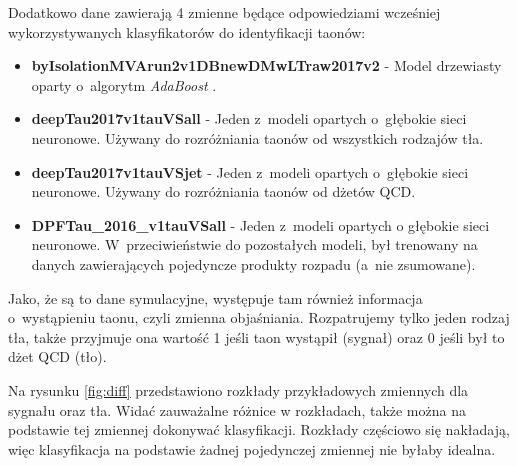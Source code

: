 \documentclass{pracalicmgr}
\begin{document}
	Dodatkowo dane zawierają 4 zmienne będące odpowiedziami wcześniej wykorzystywanych klasyfikatorów do identyfikacji taonów:
	\begin{itemize}
	\item \textbf{byIsolationMVArun2v1DBnewDMwLTraw2017v2} - Model drzewiasty oparty o~algorytm \textit{AdaBoost} \cite{freund1997decision}.
	\item \textbf{deepTau2017v1tauVSall} - Jeden z~modeli opartych o~głębokie sieci neuronowe. Używany do rozróżniania taonów od wszystkich rodzajów tła.
	\item \textbf{deepTau2017v1tauVSjet} - Jeden z~modeli opartych o~głębokie sieci neuronowe. Używany do rozróżniania taonów od dżetów QCD.
	\item \textbf{DPFTau\_2016\_v1tauVSall} - Jeden z~modeli opartych o głębokie sieci neuronowe. W~przeciwieństwie do pozostałych modeli, był trenowany na danych zawierających pojedyncze produkty rozpadu (a~nie zsumowane).
	\end{itemize}
	
	Jako, że są to dane symulacyjne, występuje tam również informacja o~wystąpieniu taonu, czyli zmienna objaśniania. Rozpatrujemy tylko jeden rodzaj tła, także przyjmuje ona wartość 1 jeśli taon wystąpił (sygnał) oraz 0 jeśli był to dżet QCD (tło).
	
	Na rysunku \ref{fig:diff} przedstawiono rozkłady przykładowych zmiennych dla sygnału oraz tła. Widać zauważalne różnice w rozkładach, także można na podstawie tej zmiennej dokonywać klasyfikacji. Rozkłady częściowo się nakładają, więc klasyfikacja na podstawie żadnej pojedynczej zmiennej nie byłaby idealna.
	
\end{document}
